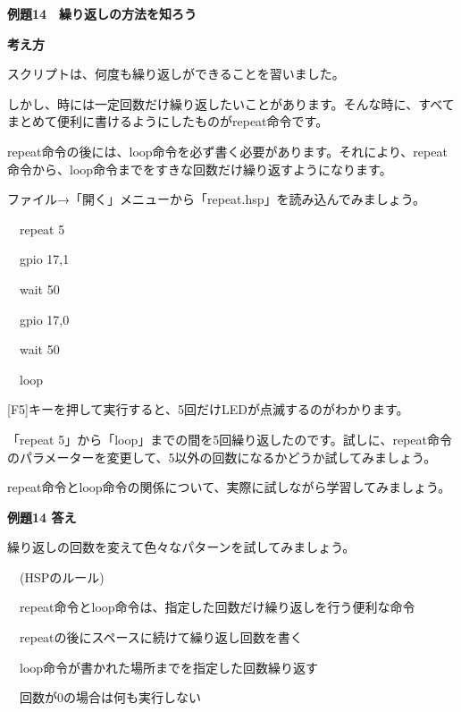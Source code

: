\documentclass[a4paper,dvipdfmx]{jarticle}
\newcommand\textstyleqwerty[1]{#1}
\begin{document}
\bigskip


\bigskip

\textstyleqwerty{\textbf{例題14　繰り返しの方法を知ろう}}



\bigskip

{\bfseries
考え方}


\bigskip

スクリプトは、何度も繰り返しができることを習いました。

しかし、時には一定回数だけ繰り返したいことがあります。そんな時に、すべてまとめて便利に書けるようにしたものがrepeat命令です。

repeat命令の後には、loop命令を必ず書く必要があります。それにより、repeat命令から、loop命令までをすきな回数だけ繰り返すようになります。

ファイル→「開く」メニューから「repeat.hsp」を読み込んでみましょう。


\bigskip

\ \ repeat 5

\ \ gpio 17,1

\ \ wait 50

\ \ gpio 17,0

\ \ wait 50

\ \ loop


\bigskip

[F5]キーを押して実行すると、5回だけLEDが点滅するのがわかります。

「repeat
5」から「loop」までの間を5回繰り返したのです。試しに、repeat命令のパラメーターを変更して、5以外の回数になるかどうか試してみましょう。

repeat命令とloop命令の関係について、実際に試しながら学習してみましょう。


\bigskip


\bigskip

{\bfseries
例題14 答え}


\bigskip

繰り返しの回数を変えて色々なパターンを試してみましょう。


\bigskip

\ \ (HSPのルール)


\bigskip

\ \ repeat命令とloop命令は、指定した回数だけ繰り返しを行う便利な命令

\ \ repeatの後にスペースに続けて繰り返し回数を書く

\ \ loop命令が書かれた場所までを指定した回数繰り返す

\ \ 回数が0の場合は何も実行しない
\end{document}
